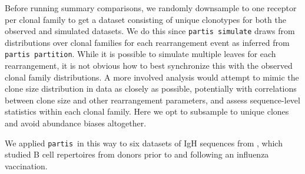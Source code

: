 \documentclass{article}
\newcommand{\partis}{\texttt{partis}}
\begin{document}
Before running summary comparisons, we randomly downsample to one receptor per clonal family to get a dataset consisting of unique clonotypes for both the observed and simulated datasets.
We do this since \texttt{partis simulate} draws from distributions over clonal families for each rearrangement event as inferred from \texttt{partis partition}.
While it is possible to simulate multiple leaves for each rearrangement, it is not obvious how to best synchronize this with the observed clonal family distributions.
A more involved analysis would attempt to mimic the clone size distribution in data as closely as possible, potentially with correlations between clone size and other rearrangement parameters, and assess sequence-level statistics within each clonal family.
Here we opt to subsample to unique clones and avoid abundance biases altogether.

We applied \partis\ in this way to six datasets of IgH sequences from \cite{Gupta2017-ve}, which studied B cell repertoires from donors prior to and following an influenza vaccination.
\end{document}

